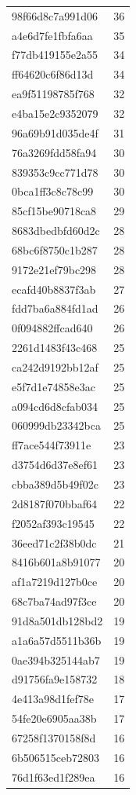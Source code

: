 \begin{tabular}{ll}
98f66d8c7a991d06 & 36 \\
a4e6d7fe1fbfa6aa & 35 \\
f77db419155e2a55 & 34 \\
ff64620c6f86d13d & 34 \\
ea9f51198785f768 & 32 \\
e4ba15e2c9352079 & 32 \\
96a69b91d035de4f & 31 \\
76a3269fdd58fa94 & 30 \\
839353c9cc771d78 & 30 \\
0bca1ff3c8c78c99 & 30 \\
85cf15be90718ca8 & 29 \\
8683dbedbfd60d2c & 28 \\
68bc6f8750c1b287 & 28 \\
9172e21ef79bc298 & 28 \\
ecafd40b8837f3ab & 27 \\
fdd7ba6a884fd1ad & 26 \\
0f094882ffcad640 & 26 \\
2261d1483f43c468 & 25 \\
ca242d9192bb12af & 25 \\
e5f7d1e74858e3ac & 25 \\
a094cd6d8cfab034 & 25 \\
060999db23342bca & 25 \\
ff7ace544f73911e & 23 \\
d3754d6d37e8ef61 & 23 \\
cbba389d5b49f02c & 23 \\
2d8187f070bbaf64 & 22 \\
f2052af393c19545 & 22 \\
36eed71c2f38b0dc & 21 \\
8416b601a8b91077 & 20 \\
af1a7219d127b0ce & 20 \\
68c7ba74ad97f3ce & 20 \\
91d8a501db128bd2 & 19 \\
a1a6a57d5511b36b & 19 \\
0ae394b325144ab7 & 19 \\
d91756fa9e158732 & 18 \\
4e413a98d1fef78e & 17 \\
54fe20e6905aa38b & 17 \\
67258f1370158f8d & 16 \\
6b506515ceb72803 & 16 \\
76d1f63ed1f289ea & 16 \\

\end{tabular}
